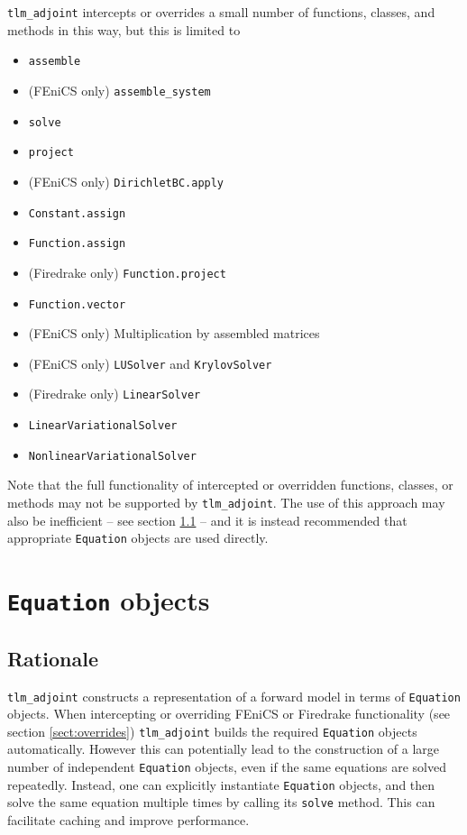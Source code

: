 \documentclass[11pt]{article}
\begin{document}
\texttt{tlm\_adjoint} intercepts or overrides a small number of functions,
classes, and methods in this way, but this is limited to
\begin{itemize}
  \item \texttt{assemble}
  \item (FEniCS only) \texttt{assemble\_system}
  \item \texttt{solve}
  \item \texttt{project}
  \item (FEniCS only) \texttt{DirichletBC.apply}
  \item \texttt{Constant.assign}
  \item \texttt{Function.assign}
  \item (Firedrake only) \texttt{Function.project}
  \item \texttt{Function.vector}
  \item (FEniCS only) Multiplication by assembled matrices
  \item (FEniCS only) \texttt{LUSolver} and \texttt{KrylovSolver}
  \item (Firedrake only) \texttt{LinearSolver}
  \item \texttt{LinearVariationalSolver}
  \item \texttt{NonlinearVariationalSolver}
\end{itemize}

Note that the full functionality of intercepted or overridden functions,
classes, or methods may not be supported by \texttt{tlm\_adjoint}. The use of
this approach may also be inefficient -- see section
\ref{sect:Equation_rationale} -- and it is instead recommended that appropriate
\texttt{Equation} objects are used directly.

\section{\texttt{Equation} objects}\label{sect:Equation}

\subsection{Rationale}\label{sect:Equation_rationale}

\texttt{tlm\_adjoint} constructs a representation of a forward model in terms
of \texttt{Equation} objects. When intercepting or overriding FEniCS or
Firedrake functionality (see section \ref{sect:overrides})
\texttt{tlm\_adjoint} builds the required \texttt{Equation} objects
automatically. However this can potentially lead to the construction of a large
number of independent \texttt{Equation} objects, even if the same equations are
solved repeatedly. Instead, one can explicitly instantiate \texttt{Equation}
objects, and then solve the same equation multiple times by calling its
\texttt{solve} method. This can facilitate caching and improve performance.
\end{document}
